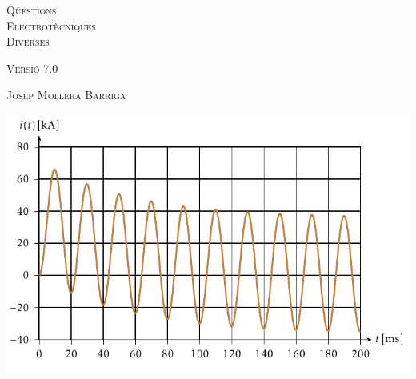 \begin{titlepage}

   \parbox{18cm}{\fontsize{60pt}{60pt}\selectfont\color{NavyBlue}\scshape%
                 Q\"{u}estions\\[30pt] Electrot\`{e}cniques\\[30pt] Diverses}

   \vspace*{1.8cm}
   {\fontsize{30pt}{30pt}\selectfont\textsc{Versi\'{o} 7.0}}

   \vspace*{1.5cm}
   {\fontsize{40pt}{40pt}\selectfont\textsc{Josep Mollera Barriga}}

   \vspace*{1cm}
   \centering
   \includegraphics{Imatges/Cap-Fonaments-Exemple-R-L.pdf}

\end{titlepage}
